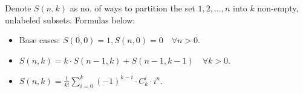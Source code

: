 Denote \(S(n, k)\) as no. of ways to partition the set $1, 2, \dotsc, n$ into $k$ non-empty, unlabeled subsets. Formulas below:
\begin{itemize}
    \item Base cases: $S(0, 0) = 1, S(n, 0) = 0 \quad \forall n > 0$.

    \item $S(n, k) = k \cdot S(n - 1, k) + S(n - 1, k - 1) \quad \forall k > 0.$

    \item $\displaystyle 
            S(n, k) = \frac{1}{k!} \sum_{i=0}^{k} (-1)^{k - i} \cdot C^i_k \cdot i^n.$
\end{itemize}